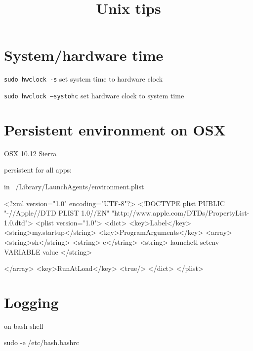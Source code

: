 


\title{Unix tips}


\date{}


\maketitle

\justify

\renewcommand{\abstractname}{}

\begin{abstract}

\end{abstract}



\section*{System/hardware time}

\texttt{sudo hwclock -s} set system time to hardware clock

\texttt{sudo hwclock --systohc} set hardware clock to system time



\section*{Persistent environment on OSX}

OSX 10.12 Sierra

persistent for all apps: 

in ~/Library/LaunchAgents/environment.plist

<?xml version="1.0" encoding="UTF-8"?>
<!DOCTYPE plist PUBLIC "-//Apple//DTD PLIST 1.0//EN" "http://www.apple.com/DTDs/PropertyList-1.0.dtd">
<plist version="1.0">
<dict>
  <key>Label</key>
  <string>my.startup</string>
  <key>ProgramArguments</key>
  <array>
    <string>sh</string>
    <string>-c</string>
    <string>
    launchctl setenv VARIABLE value
  </string>

  </array>
  <key>RunAtLoad</key>
  <true/>
</dict>
</plist>




\section*{Logging}

on bash shell

sudo -e /etc/bash.bashrc

